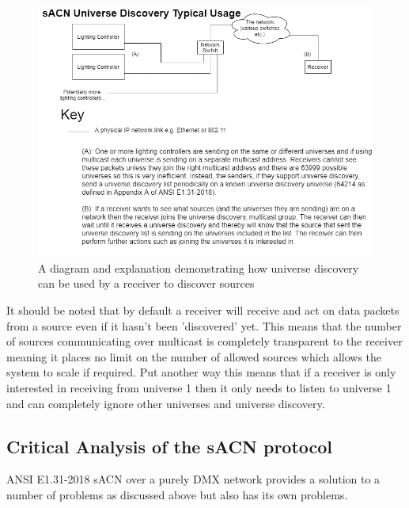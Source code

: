 \documentclass[11pt,a4paper]{article}
\begin{document}
\begin{figure}[H]
	\label{UNI_DISCOVERY_DESC}
	\includegraphics[width=\textwidth]{CS4099-Discovery-Explaination}
	\caption{A diagram and explanation demonstrating how universe discovery can be used by a receiver to discover sources}
\end{figure}

It should be noted that by default a receiver will receive and act on data packets from a source even if it hasn't been 'discovered' yet. This means that the number of sources communicating over multicast is completely transparent to the receiver meaning it places no limit on the number of allowed sources which allows the system to scale if required. Put another way this means that if a receiver is only interested in receiving from universe 1 then it only needs to listen to universe 1 and can completely ignore other universes and universe discovery.

\subsection{Critical Analysis of the sACN protocol}
ANSI E1.31-2018 sACN over a purely DMX network provides a solution to a number of problems as discussed above but also has its own problems.\\
\end{document}

